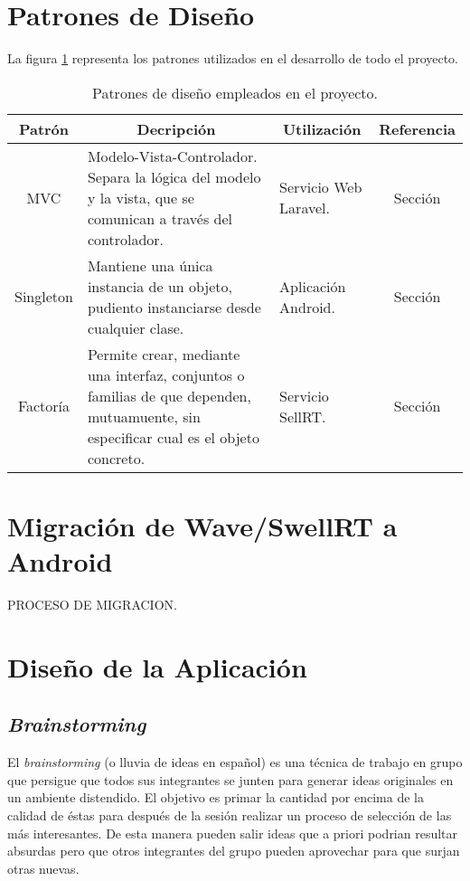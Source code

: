 \section{Patrones de Diseño}

La figura \ref{fig:tablePatrones} representa los patrones utilizados en el desarrollo de todo el proyecto.

\begin{table}[!]
\centering
\caption{Patrones de diseño empleados en el proyecto.}
\label{my-label}
\begin{tabular}{|c|m{5cm}|l|c|}
\hline
{\bf Patrón} & \multicolumn{1}{c|}{{\bf Decripción}}                                                                                                & \multicolumn{1}{c|}{{\bf Utilización}} & {\bf Referencia} \\ \hline
MVC          & Modelo-Vista-Controlador. Separa la lógica del modelo y la vista, que se comunican a través del controlador.                         & Servicio Web Laravel.                  & Sección          \\ \hline
Singleton    & Mantiene una única instancia de un objeto, pudiento instanciarse desde cualquier clase.                                              & Aplicación Android.                    & Sección          \\ \hline
Factoría     & Permite crear, mediante una interfaz, conjuntos o familias de que dependen, mutuamuente, sin especificar cual es el objeto concreto. & Servicio SellRT.                       & Sección          \\ \hline
\end{tabular}
\label{fig:tablePatrones}
\end{table}

\section{Migración de Wave/SwellRT a Android}

PROCESO DE MIGRACION.

\section{Diseño de la Aplicación}

  \subsection{\textit{Brainstorming}}
  
  El \textit{brainstorming} \cite{ref:bookBrainStorming} (o lluvia de ideas en español) es una técnica de trabajo en grupo que persigue que todos sus integrantes se junten para generar ideas originales en un ambiente distendido. El objetivo es primar la cantidad por encima de la calidad de éstas para después de la sesión realizar un proceso de selección de las más interesantes. De esta manera pueden salir ideas que a priori podrian resultar absurdas pero que otros integrantes del grupo pueden aprovechar para que surjan otras nuevas.  
  

